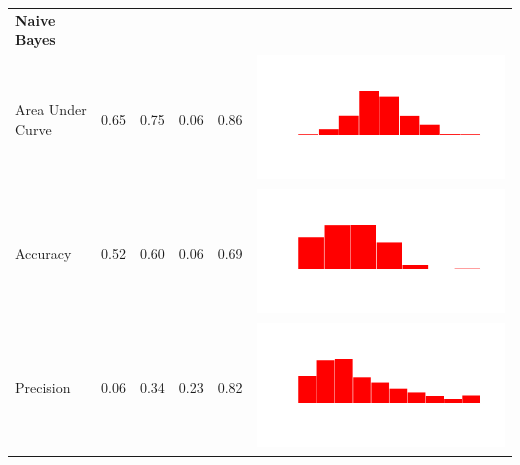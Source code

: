 \documentclass[conference]{IEEEtran}
\begin{document}
\begin{table}
\begin{tabular}{lrrrrc}
    \bf{Naive Bayes}\\
    Area Under Curve & 0.65 & 0.75 & 0.06 & 0.86 & \includegraphics[scale = 0.1, clip = true, trim= 50px 60px 50px 60px]{../figs/hist-results/hist-NBauc.pdf} \\
    Accuracy & 0.52 & 0.60 & 0.06 & 0.69 & \includegraphics[scale = 0.1, clip = true, trim= 50px 60px 50px 60px]{../figs/hist-results/hist-NBacc.pdf} \\
    Precision & 0.06 & 0.34 & 0.23 & 0.82 & \includegraphics[scale = 0.1, clip = true, trim= 50px 60px 50px 60px]{../figs/hist-results/hist-NBprec.pdf} \\

\end{tabular}
\end{table}
\end{document}
